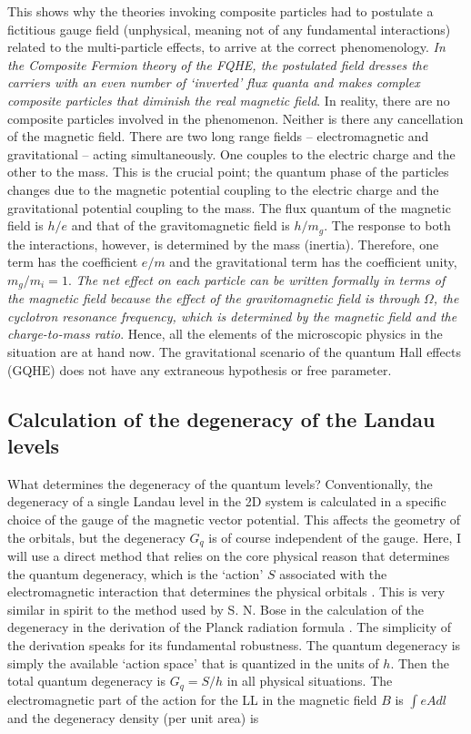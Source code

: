 \documentclass[aps,preprint,12pt,tightenlines]{revtex4}%
\begin{document}
This shows why the theories invoking composite particles had to postulate a
fictitious gauge field (unphysical, meaning not of any fundamental
interactions) related to the multi-particle effects, to arrive at the correct
phenomenology. \emph{In the Composite Fermion theory of the FQHE, the
postulated field dresses the carriers with an even number of `inverted' flux
quanta and makes complex composite particles that diminish the real magnetic
field}. In reality, there are no composite particles involved in the
phenomenon. Neither is there any cancellation of the magnetic field. There are
two long range fields -- electromagnetic and gravitational -- acting
simultaneously. One couples to the electric charge and the other to the mass.
This is the crucial point; the quantum phase of the particles changes due to
the magnetic potential coupling to the electric charge and the gravitational
potential coupling to the mass. The flux quantum of the magnetic field is
$h/e$ and that of the gravitomagnetic field is $h/m_{g}$. The response to both
the interactions, however, is determined by the mass (inertia). Therefore, one
term has the coefficient $e/m$ and the gravitational term has the coefficient
unity, $m_{g}/m_{i}=1$. \emph{The net effect on each particle can be written
formally in terms of the magnetic field because the effect of the
gravitomagnetic field is through }$\Omega$\emph{, the cyclotron resonance
frequency, which is determined by the magnetic field and the charge-to-mass
ratio}. Hence, all the elements of the microscopic physics in the situation
are at hand now. The gravitational scenario of the quantum Hall effects (GQHE)
does not have any extraneous hypothesis or free parameter. 

\subsection{Calculation of the degeneracy of the Landau levels}

What determines the degeneracy of the quantum levels? Conventionally, the
degeneracy of a single Landau level in the 2D system is calculated in a
specific choice of the gauge of the magnetic vector potential. This affects
the geometry of the orbitals, but the degeneracy $G_{q}$ is of course
independent of the gauge. Here, I will use a direct method that relies on the
core physical reason that determines the quantum degeneracy, which is the
`action' $S$ associated with the electromagnetic interaction that determines
the physical orbitals \cite{Unni-RQM}. This is very similar in spirit to the method used by S.
N. Bose in the calculation of the degeneracy in the derivation of the Planck
radiation formula \cite{Bose-1924}. The simplicity of the derivation speaks
for its fundamental robustness. The quantum degeneracy is simply the available
`action space' that is quantized in the units of $h.$ Then the total quantum
degeneracy is $G_{q}=S/h$ in all physical situations. The electromagnetic part
of the action for the LL in the magnetic field $B$ is $\int eAdl$
and the degeneracy density (per unit area) is%
\end{document}
